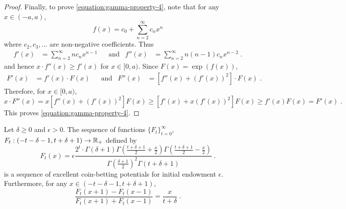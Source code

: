 \begin{proof}
Finally, to prove \eqref{equation:gamma-property-4}, note that
for any $x \in (-a,a)$,
\[
f(x) = c_0 + \sum_{n=2}^\infty c_n x^n
\]
where $c_2, c_3, \dots$ are non-negative coefficients. Thus
\begin{align*}
f'(x) & = \sum_{n=2}^\infty n c_n x^{n-1} &
& \text{and} &
f''(x) & = \sum_{n=2}^\infty n (n-1) c_n x^{n-2} \; .
\end{align*}
and hence $x \cdot f''(x) \ge f'(x)$ for $x \in [0,a)$. Since $F(x) = \exp(f(x))$,
\begin{align*}
F'(x) & = f'(x) \cdot F(x) &
& \text{and} &
F''(x) & = \left[f''(x) + (f'(x))^2 \right] \cdot F(x) \; .
\end{align*}
Therefore, for $x \in [0,a)$,
\[
x \cdot F''(x)
= x \left[ f''(x) + (f'(x))^2 \right] F(x)
\ge \left[ f'(x) + x (f'(x))^2 \right] F(x)
\ge f'(x) F(x) = F'(x) \; .
\]
This proves \eqref{equation:gamma-property-4}.
\end{proof}

\begin{theorem}[KT potential]
\label{theorem:kt-potential}
Let $\delta \ge 0$ and $\epsilon > 0$. The sequence of functions
$\{F_t\}_{t=0}^\infty$, $F_t:(-t-\delta-1, t+\delta+1) \to \mathbb{R}_+$ defined by
\[
F_t(x) = \epsilon \frac{2^t \cdot \Gamma(\delta + 1) \Gamma(\frac{t+\delta+1}{2} + \frac{x}{2}) \Gamma(\frac{t+\delta+1}{2} - \frac{x}{2})}{\Gamma(\frac{\delta+1}{2})^2 \Gamma(t+\delta+1)} \; .
\]
is a sequence of excellent coin-betting potentials for initial endowment $\epsilon$.
Furthermore, for any $x \in (-t-\delta-1, t+\delta+1)$,
\begin{equation}
\label{equation:kt-potential-beta}
\frac{F_t(x+1) - F_{t}(x-1)}{F_t(x+1) + F_{t}(x-1)} = \frac{x}{t+\delta} \; .
\end{equation}
\end{theorem}

